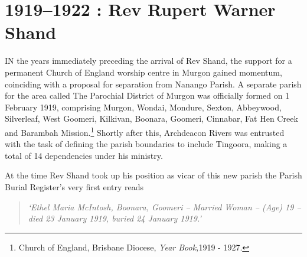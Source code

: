 \balance


\printendnotes[custom]
\setcounter{endnote}{0}
\chapter{1919--1922 : Rev Rupert Warner Shand}
\nobalance


\lettrine[lines=3]{I}{N}
 the years immediately preceding the arrival of Rev Shand, the support for a permanent Church of England worship centre in Murgon gained momentum, coinciding with a proposal for separation from Nanango Parish. A separate parish for the area called The Parochial District of Murgon was officially formed on 1 February 1919, comprising Murgon, Wondai, Mondure, Sexton, Abbeywood, Silverleaf, West Goomeri, Kilkivan, Boonara, Goomeri, Cinnabar, Fat Hen Creek and Barambah Mission.\footnote{Church of England, Brisbane Diocese, \emph{Year Book,}1919 - 1927.} Shortly after this, Archdeacon Rivers was entrusted with the task of defining the parish boundaries to include Tingoora, making a total of 14 dependencies under his ministry.

At the time Rev Shand took up his position as vicar of this new parish the Parish Burial Register's very first entry reads



\begin{quote}

\emph{`Ethel Maria McIntosh, Boonara, Goomeri -- Married Woman -- (Age) 19 -- died 23 January 1919, buried 24 January 1919.'}

\end{quote}









